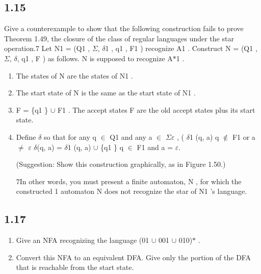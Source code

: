 \subsection*{1.15}

Give a counterexample to show that the following construction fails to prove Theorem 1.49, the closure of the class of regular languages under the star operation.7 Let N1 = (Q1 , $\Sigma$, $\delta$1 , q1 , F1 ) recognize A1 . Construct N = (Q1 , $\Sigma$, $\delta$, q1 , F ) as follows. N is supposed to recognize A$\ast$1 .

\begin{enumerate}[label=(\alph*), leftmargin=2.5em]

\item The states of N are the states of N1 .

\item The start state of N is the same as the start state of N1 .

\item F = \{q1 \} $\cup$ F1 . The accept states F are the old accept states plus its start state.

\item Define $\delta$ so that for any q $\in$ Q1 and any a $\in$ $\Sigma$$\varepsilon$ , ( $\delta$1 (q, a) q $\notin$ F1 or a $\neq$ $\varepsilon$ $\delta$(q, a) = $\delta$1 (q, a) $\cup$ \{q1 \} q $\in$ F1 and a = $\varepsilon$.

(Suggestion: Show this construction graphically, as in Figure 1.50.)

7In other words, you must present a finite automaton, N , for which the constructed 1 automaton N does not recognize the star of N1 's language.

\end{enumerate}


\subsection*{1.17}

\begin{enumerate}[label=(\alph*), leftmargin=2.5em]

\item Give an NFA recognizing the language (01 $\cup$ 001 $\cup$ 010)$\ast$ .

\item Convert this NFA to an equivalent DFA. Give only the portion of the DFA that is reachable from the start state.

\end{enumerate}


